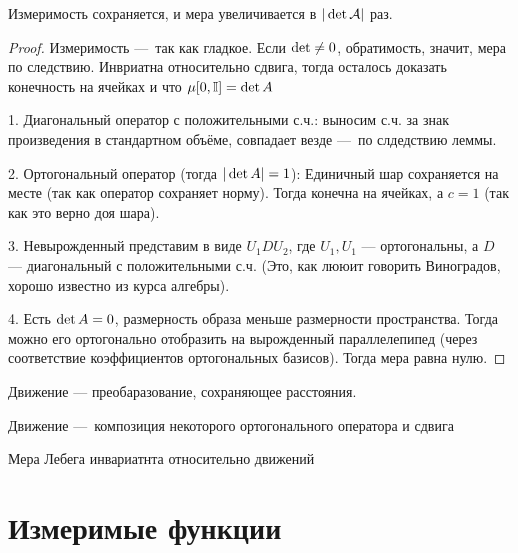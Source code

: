 \documentclass[12pt, a4paper, oneside]{memoir}
\begin{document}
\begin{theorem}

    Измеримость сохраняется, и мера увеличивается в $|\operatorname{det} \mathcal{A}|$ раз.

    \begin{proof}
        Измеримость — так как гладкое.
        Если $\operatorname{det} \neq 0$, обратимость, значит, мера по следствию.
        Инвриатна относительно сдвига, тогда осталось доказать конечность
        на ячейках и что $\mu [0, \mathbb{I}] = \operatorname{det} A$
        
        1. Диагональный оператор с положительными с.ч.:
        выносим с.ч. за знак произведения в стандартном объёме, совпадает везде — по слдедствию леммы.

        2. Ортогональный оператор (тогда $|\operatorname{det} A| = 1$): 
        Единичный шар сохраняется на месте (так как оператор сохраняет норму).
        Тогда конечна на ячейках, а $c = 1$ (так как это верно доя шара).

        3. Невырожденный представим в виде $U_1 D U_2$, где $U_1, U_1$ — ортогональны, а $D$ — диагональный с положительными с.ч.
        (Это, как лююит говорить Виноградов, хорошо известно из курса алгебры).

        4. Есть $\operatorname{det} A = 0$, размерность образа меньше размерности пространства.
        Тогда можно его ортогонально отобразить на вырожденный параллелепипед
        (через соответствие коэффициентов ортогональных базисов). Тогда мера равна нулю.
    \end{proof}
\end{theorem}

\begin{definition}
    Движение — преобаразование, сохраняющее расстояния.
\end{definition}

\begin{remark}
    Движение — композиция некоторого ортогонального оператора и сдвига
\end{remark}

\begin{corollary}
    Мера Лебега инвариатнта относительно движений
\end{corollary}




\section{Измеримые функции}
\end{document}
